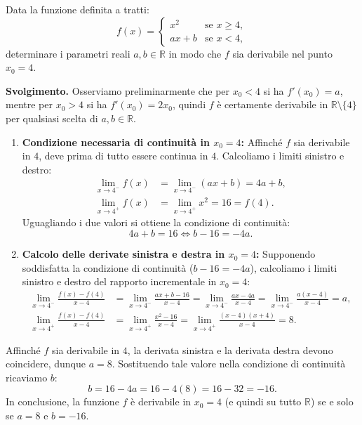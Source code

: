 \begin{esbox}
Data la funzione definita a tratti:
\[
    f(x) = \begin{cases} x^2 & \text{se } x \ge 4, \\ ax + b & \text{se } x < 4, \end{cases}
\]
determinare i parametri reali $a, b \in \mathbb{R}$ in modo che $f$ sia derivabile nel punto $x_0 = 4$.

\medskip
\noindent\textbf{Svolgimento.}
Osserviamo preliminarmente che per $x_0 < 4$ si ha $f'(x_0) = a$, mentre per $x_0 > 4$ si ha $f'(x_0) = 2x_0$, quindi $f$ è certamente derivabile in $\mathbb{R} \setminus \{4\}$ per qualsiasi scelta di $a, b \in \mathbb{R}$.

\begin{enumerate}
    \item \textbf{Condizione necessaria di continuità in $x_0 = 4$:} Affinché $f$ sia derivabile in $4$, deve prima di tutto essere continua in $4$. Calcoliamo i limiti sinistro e destro:
    \begin{align*}
        \lim_{x \to 4^-} f(x) &= \lim_{x \to 4^-} (ax + b) = 4a + b, \\
        \lim_{x \to 4^+} f(x) &= \lim_{x \to 4^+} x^2 = 16 = f(4).
    \end{align*}
    Uguagliando i due valori si ottiene la condizione di continuità:
    \[
        4a + b = 16 \iff b - 16 = -4a.
    \]

    \item \textbf{Calcolo delle derivate sinistra e destra in $x_0 = 4$:} Supponendo soddisfatta la condizione di continuità ($b - 16 = -4a$), calcoliamo i limiti sinistro e destro del rapporto incrementale in $x_0 = 4$:
    \begin{align*}
        \lim_{x \to 4^-} \frac{f(x) - f(4)}{x - 4} &= \lim_{x \to 4^-} \frac{ax + b - 16}{x - 4} = \lim_{x \to 4^-} \frac{ax - 4a}{x - 4} = \lim_{x \to 4^-} \frac{a(x - 4)}{x - 4} = a, \\
        \lim_{x \to 4^+} \frac{f(x) - f(4)}{x - 4} &= \lim_{x \to 4^+} \frac{x^2 - 16}{x - 4} = \lim_{x \to 4^+} \frac{(x - 4)(x + 4)}{x - 4} = 8.
    \end{align*}
\end{enumerate}
Affinché $f$ sia derivabile in $4$, la derivata sinistra e la derivata destra devono coincidere, dunque $a = 8$. Sostituendo tale valore nella condizione di continuità ricaviamo $b$:
\[
    b = 16 - 4a = 16 - 4(8) = 16 - 32 = -16.
\]
In conclusione, la funzione $f$ è derivabile in $x_0 = 4$ (e quindi su tutto $\mathbb{R}$) se e solo se $a = 8$ e $b = -16$.
\end{esbox}

